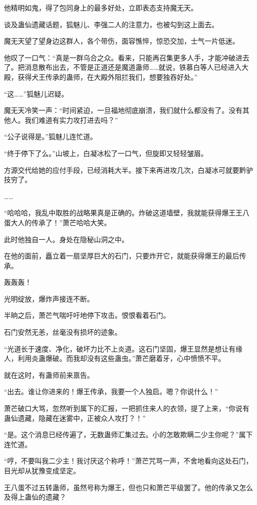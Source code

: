 \begin{this_body}
他精明如鬼，得了包同身上的最多好处，立即表态支持魔无天。

谈及蛊仙遗藏话题，狐魅儿、李强二人的注意力，也被勾到这上面去。

魔无天望了望身边这群人，各个带伤，面容憔悴，惊恐交加，士气一片低迷。

他叹了一口气：“真是一群乌合之众。看来，只能再召集更多人手，才能冲破进去了。把消息散布出去，不管是正道还是魔道蛊师……就说，铁慕白等人已经进入大殿，获得犬王传承的蛊师，在大殿外阻拦我们，想要独吞好处。”

“这……”狐魅儿迟疑。

魔无天冷笑一声：“时间紧迫，一旦福地彻底崩溃，我们就什么都没有了。没有其他人。我们难道有实力攻打进去吗？”

“公子说得是。”狐魅儿连忙道。

“终于停下了么。”山坡上，白凝冰松了一口气，但旋即又轻轻皱眉。

方源交代给她的应付手段，已经消耗大半。接下来再进攻几次，白凝冰可就要黔驴技穷了。

……

“哈哈哈，我乱中取胜的战略果真是正确的。炸破这道墙壁，我就能获得爆王王八蛋大人的传承了！”萧芒哈哈大笑。

此时他独自一人。身处在隐秘山洞之中。

在他的面前，矗立着一扇坚厚巨大的石门，只要炸开它，就能获得爆王的最后传承。

轰轰轰！

光明绽放，爆炸声接连不断。

半晌之后，萧芒气喘吁吁地停下攻击。恨恨看着石门。

石门安然无恙，丝毫没有损坏的迹象。

“光道长于速度、净化，破坏力比不上炎道。这石门坚固，爆王显然是想让有缘人，利用炎蛊爆破。而我却没有这些蛊虫。”萧芒磨着牙，心中愤愤不平。

就在这时，有蛊师前来禀告。

“出去。谁让你进来的！爆王传承，我要一个人独启。嗯？你说什么！”

萧芒破口大骂，忽然听到属下的汇报，一把抓住来人的衣领，提了上来，“你说有蛊仙遗藏，隐藏在迷雾中，正被众人攻打？！”

“是。这个消息已经传遍了，无数蛊师汇集过去。小的怎敢欺瞒二少主你呢？”属下连忙道。

“哼，不要叫我二少主！我讨厌这个称呼！”萧芒咒骂一声，不舍地看向这处石门，目光却从犹豫变成坚定。

王八蛋不过五转蛊师，虽然号称为爆王，但也只和萧芒平级罢了。他的传承又怎么及得上蛊仙的遗藏？


\end{this_body}
